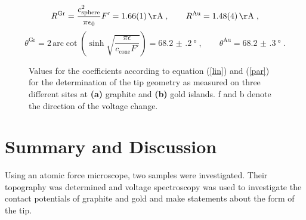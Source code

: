 \documentclass[a4paper]{scrartcl}
\numberwithin{equation}{section}
\numberwithin{figure}{section}
\numberwithin{table}{section}
\newcommand{\eq}[2]{\begin{equation}#1\label{#2}\end{equation}}
\newcommand{\Formel}[1]{(\ref{#1})}
\begin{document}
\eq{R^\text{Gr}=\frac{c_\text{sphere}^2}{\pi \epsilon_0} F' = \SI{1.66(1)}{\AA} \; , \qquad R^\text{Au}=\SI{1.48(4)}{\AA} \; , } {Rval}
\eq{\theta^\text{Gr}=2 \,\text{arc}\cot \left( \sinh \sqrt{\frac{\pi \epsilon}{c_\text{cone} F'}}\right) =\SI{68.2(2)}{\degree} \; , \qquad \theta^\text{Au}=\SI{68.2(3)}{\degree} \; . }{}

\begin{figure}
\hfill
{}
\caption{\small Values for the coefficients according to equation \Formel{lin} and \Formel{par} for the determination of the tip geometry as measured on three different sites at \textbf{(a)} graphite and \textbf{(b)} gold islands. f and b denote the direction of the voltage change.}
\label{fig:cwerte}
\end{figure}



\FloatBarrier
\section{Summary and Discussion}
Using an atomic force microscope, two samples were investigated. Their topography was determined and voltage spectroscopy was used to investigate the contact potentials of graphite and gold and make statements about the form of the tip.
\end{document}
